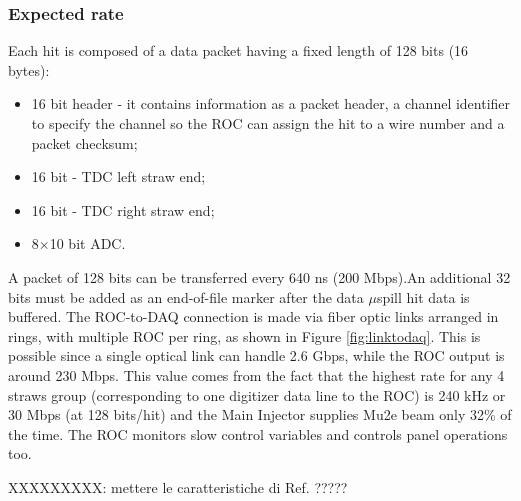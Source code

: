 \subsubsection{Expected rate}





Each hit is composed of a data packet having a fixed length of 128 bits (16 bytes):
\begin{itemize}
    \item 16 bit header - it contains information as a packet header, a channel identifier to specify the channel so the ROC can assign the hit to a wire number and a packet checksum;
    \item 16 bit - TDC left straw end;
    \item 16 bit - TDC right straw end;
    \item 8$\times$10 bit ADC.
\end{itemize}
A packet of 128 bits can be transferred every 640 ns (200 Mbps).An additional 32
bits must be added as an end-of-file marker after the data $\mu$spill hit data is buffered.
The ROC-to-DAQ connection is made via fiber optic links arranged in rings, with multiple ROC per ring, as shown in Figure \ref{fig:linktodaq}. This is possible since a single optical link can handle 2.6 Gbps, while the ROC output is around 230 Mbps. This value comes from the fact that the highest rate for any 4 straws group (corresponding to one digitizer data line to the ROC) is 240 kHz or 30 Mbps (at 128 bits/hit) and the Main Injector supplies Mu2e beam only 32\% of the time. The ROC monitors slow control variables and controls panel operations too.


XXXXXXXXX: mettere le caratteristiche di Ref. \cite{vadi}  ?????

